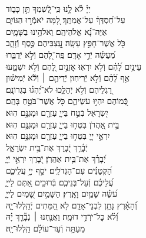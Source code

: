 \documentclass[twoside, openany, parskip=half, 11pt]{book}
\begin{document}
{\begin{narrow}
\\
יְיָ֗ לֹ֫א לָ֥נוּ \hfill כִּֽי־לְֿ֭שִׁמְךָ תֵּ֣ן כָּב֑וֹד \\ עַל־חַ֝סְדְּךָ֗ עַל־אֲמִתֶּֽךָ׃ \hfill
לָ֭מָּה יֹאמְֿר֣וּ הַגּוֹיִ֑ם\\ אַיֵּה־נָ֗֝א אֱלֹהֵיהֶֽם׃ \hfill
וֵאלֹהֵ֥ינוּ בַשָּׁמָ֑יִם\\ כֹּ֖ל אֲשֶׁר־חָפֵ֣ץ עָשָֽׂה׃ \hfill
עֲֽ֭צַבֵּיהֶם כֶּ֣סֶף וְֿזָהָ֑ב\\ מַ֝עֲשֵׂ֗ה יְֿדֵ֣י אָדָֽם׃ \hfill
פֶּֽה־לָ֭הֶם וְֿלֹ֣א יְֿדַבֵּ֑רוּ\\ עֵינַ֥יִם לָ֝הֶ֗ם וְֿלֹ֣א יִרְאֽוּ׃ \hfill
אׇזְנַ֣יִם לָ֭הֶם וְֿלֹ֣א יִשְׁמָ֑עוּ\\ אַ֥ף לָ֝הֶ֗ם וְֿלֹ֣א יְֿרִיחֽוּן׃ \hfill
יְֿדֵיהֶ֤ם ׀ וְֿלֹ֬א יְֿמִישׁ֗וּן\\ רַ֭גְלֵיהֶם וְֿלֹ֣א יְֿהַלֵּ֑כוּ \hfill לֹא־יֶ֝הְגּ֗וּ בִּגְרוֹנָֽם׃ \\
כְּֿ֭מוֹהֶם יִהְי֣וּ עֹשֵׂיהֶ֑ם \hfill כֹּ֖ל אֲשֶׁר־בֹּטֵ֣חַ בָּהֶֽם׃ \\
יִ֭שְׂרָאֵל בְּֿטַ֣ח בַּייָ֑ \hfill עֶזְרָ֖ם וּמָגִנָּ֣ם הֽוּא׃ \\
בֵּ֣ית אַ֭הֲרֹן בִּטְח֣וּ בַייָ֑ \hfill עֶזְרָ֖ם וּמָגִנָּ֣ם הֽוּא׃ \\
יִרְאֵ֣י יְיָ֭ בִּטְח֣וּ בַייָ֑ \hfill עֶזְרָ֖ם וּמָגִנָּ֣ם הֽוּא׃ \\

יְֿבָ֫רֵ֥ךְ יְֿ֭בָרֵךְ \hfill אֶת־בֵּ֣ית יִשְׂרָאֵ֑ל\\ יְֿ֝בָרֵ֗ךְ אֶת־בֵּ֥ית אַהֲרֹֽן׃ \hfill
יְֿ֭בָרֵךְ יִרְאֵ֣י יְֿיָ֑\\ הַ֝קְּטַנִּ֗ים עִם־הַגְּדֹלִֽים׃ \hfill
יֹסֵ֣ף יְיָ֣ עֲלֵיכֶ֑ם\\ עֲ֝לֵיכֶ֗ם וְֿעַל־בְּנֵיכֶֽם׃ \hfill
בְּֿרוּכִ֣ים אַ֭תֶּם לַייָ֑\\ עֹ֝שֵׂ֗ה שָׁמַ֥יִם וָאָֽרֶץ׃ \hfill
הַשָּׁמַ֣יִם שָׁ֭מַיִם לַייָ֑\\ וְֿ֝הָאָ֗רֶץ נָתַ֥ן לִבְנֵי־אָדָֽם׃ \hfill
לֹ֣א הַ֭מֵּתִים יְֿהַֽלְלוּ־יָ֑הּ\\ וְֿ֝לֹ֗א כׇּל־יֹרְֿדֵ֥י דוּמָֽה׃ \hfill
וַאֲנַ֤חְנוּ ׀ נְֿבָ֘רֵ֤ךְ יָ֗הּ\\ מֵעַתָּ֥ה וְֿעַד־עוֹלָ֗ם הַֽלְלוּ־יָֽהּ׃ \hfill \break



\end{narrow}}
\end{document}
